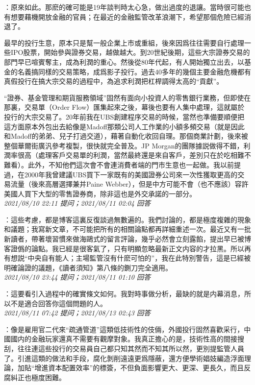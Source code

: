 \documentclass[twocolumn]{ctexart}
\begin{document}
：原來如此。那麽的確可能是19年談判時太心急，做出過度的退讓。當時很可能也有想要藉機開放金融的官員；在最近的金融監管改革浪潮下，希望那個危險已經消退了。

最早的投行生意，原本只是幫一般企業上市或重組，後來因爲往往需要自行處理一些IPO股票，開始參與證券交易，越做越大。到20世紀後期，這些大宗證券交易的部門早已喧賓奪主，成為利潤的重心。然後從80年代起，有人開始獨立出去，以基金的名義搞同樣的交易策略，成爲影子投行。過去40多年的幾個主要金融危機都有真假投行在搞大宗交易的過程中，為追求利潤把杠桿調得太高的“貢獻”。

“證券、基金管理和期貨服務領域”固然有面向小投資人的零售銀行業務，但即使在那裏，交易單（Order Flow）匯集起來之後，幕後也要有人集中處理，這就屬於投行的大宗交易了。20年前我在UBS創建程序交易的時候，當然也準備要順便把這方面原本外包出去給像是Madoff那類公司人工作業的小額多頻交易（就是因此和Madoff的弟弟、兒子打過交道），藉著自動化收回自理。那個商業計劃，後來被整個華爾街廣汎參考複製，很快就完全普及。JP Morgan的團隊據説做得不錯，利潤率很高（處理客戶交易單的利潤，當然最終還是來自客戶，差別只在於吃相難不難看）。此外，不知他們這次會不會連消費者端的門市生意也一起做。我以前提過，在2000年我曾建議UBS買下一家既有的美國證券公司來一次性獲取更高的交易流量（後來高層選擇兼并Paine Webber），但是中方可能不會（也不應該）容許美國人買下大型的零售證券商，除非這也是外交承諾的一部分。
\\

\textit{\hfill\noindent\small 2021/08/10 22:11 提问；2021/08/11 02:04 回答}

：這些考慮，都是博客這裏反復談過無數遍的。我們討論的，都是極度複雜的現象和議題；我寫新文章，不可能把所有的相關論點都再詳細重述一次。最近又有一批新讀者，帶著壞習慣來做海鷗式的留言評論，幾乎必然會立刻露餡，提出早已被博客證僞的論點。我已經是很客氣了，只有明顯忽略最新正文内容的才拉黑。所以再有想説“中央自有能人；主場監管沒有什麽可怕的”，我在此特別警告，這是已經被明確論證的議題，《讀者須知》第八條的鍘刀完全適用。
\\

\textit{\hfill\noindent\small 2021/08/10 23:44 提问；2021/08/11 01:10 回答}

：這要看引入過程中的確實條文如何。我對時事做分析，最缺的就是内幕消息，所以不是適合回答你這個問題的人。
\\

\textit{\hfill\noindent\small 2021/08/11 07:42 提问；2021/08/13 02:43 回答}

：像是雇用官二代來“疏通管道”這類低技術性的伎倆，外國投行固然喜歡采行，中國國内的金融玩家還真不需要有觀摩對象。我真正擔心的是，技術性高的間接搜刮，往往連這些投行的交易員自己都只知其然而不知其所以然，更別提監管人員了。引進這類的做法和手段，腐化剝削遠遠更爲隱蔽，還方便學術娼妓編造浮面理論，加貼“增進資本配置效率”的標簽，不但負面影響更大、更深、更長久，而且反腐糾正也極度困難。
\\
\end{document}
